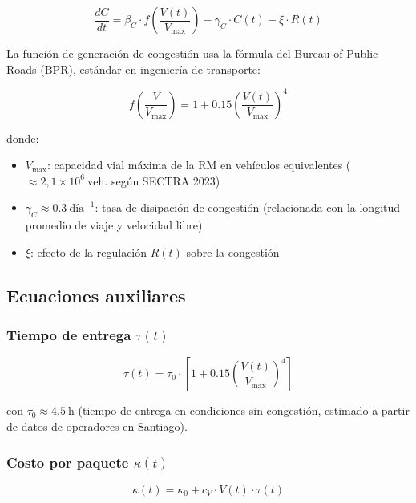 \documentclass[12pt,a4paper]{article}
\begin{document}
\begin{equation}
\boxed{
\frac{dC}{dt} = \beta_C \cdot f\!\left(\frac{V(t)}{V_{\max}}\right) - \gamma_C \cdot C(t)
  - \xi \cdot R(t)
}
\label{eq:congestion}
\end{equation}

La función de generación de congestión usa la fórmula del Bureau of
Public Roads (BPR), estándar en ingeniería de transporte:

\begin{equation}
f\!\left(\frac{V}{V_{\max}}\right) = 1 + 0.15\left(\frac{V(t)}{V_{\max}}\right)^4
\end{equation}

donde:
\begin{itemize}[leftmargin=2cm,itemsep=2pt]
  \item $V_{\max}$: capacidad vial máxima de la RM en vehículos equivalentes
    ($\approx 2{,}1 \times 10^6\ \text{veh.}$ según SECTRA 2023)
  \item $\gamma_C \approx 0.3\ \text{día}^{-1}$: tasa de disipación de congestión
    (relacionada con la longitud promedio de viaje y velocidad libre)
  \item $\xi$: efecto de la regulación $R(t)$ sobre la congestión
\end{itemize}

\subsection{Ecuaciones auxiliares}

\subsubsection{Tiempo de entrega $\tau(t)$}

\begin{equation}
\tau(t) = \tau_0 \cdot \left[1 + 0.15\left(\frac{V(t)}{V_{\max}}\right)^4\right]
\label{eq:tau}
\end{equation}

con $\tau_0 \approx 4.5\ \text{h}$ (tiempo de entrega en condiciones sin congestión,
estimado a partir de datos de operadores en Santiago).

\subsubsection{Costo por paquete $\kappa(t)$}

\begin{equation}
\kappa(t) = \kappa_0 + c_V \cdot V(t) \cdot \tau(t)
\label{eq:costo}
\end{equation}
\end{document}
